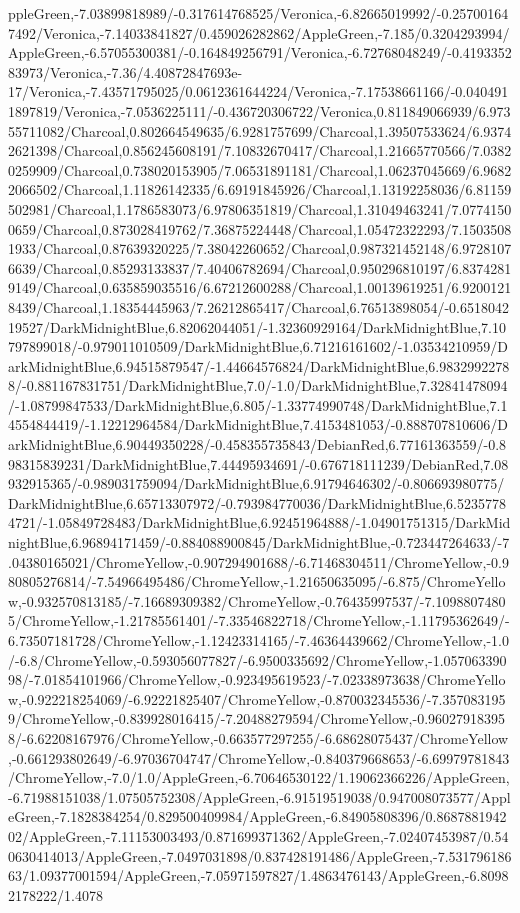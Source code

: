 {\begin{tikzternal}
ppleGreen,-7.03899818989/-0.317614768525/Veronica,-6.82665019992/-0.257001647492/Veronica,-7.14033841827/0.459026282862/AppleGreen,-7.185/0.3204293994/AppleGreen,-6.57055300381/-0.164849256791/Veronica,-6.72768048249/-0.419335283973/Veronica,-7.36/4.40872847693e-17/Veronica,-7.43571795025/0.0612361644224/Veronica,-7.17538661166/-0.0404911897819/Veronica,-7.0536225111/-0.436720306722/Veronica,0.811849066939/6.97355711082/Charcoal,0.802664549635/6.9281757699/Charcoal,1.39507533624/6.93742621398/Charcoal,0.856245608191/7.10832670417/Charcoal,1.21665770566/7.03820259909/Charcoal,0.738020153905/7.06531891181/Charcoal,1.06237045669/6.96822066502/Charcoal,1.11826142335/6.69191845926/Charcoal,1.13192258036/6.81159502981/Charcoal,1.1786583073/6.97806351819/Charcoal,1.31049463241/7.07741500659/Charcoal,0.873028419762/7.36875224448/Charcoal,1.05472322293/7.15035081933/Charcoal,0.87639320225/7.38042260652/Charcoal,0.987321452148/6.97281076639/Charcoal,0.85293133837/7.40406782694/Charcoal,0.950296810197/6.83742819149/Charcoal,0.635859035516/6.67212600288/Charcoal,1.00139619251/6.92001218439/Charcoal,1.18354445963/7.26212865417/Charcoal,6.76513898054/-0.651804219527/DarkMidnightBlue,6.82062044051/-1.32360929164/DarkMidnightBlue,7.10797899018/-0.979011010509/DarkMidnightBlue,6.71216161602/-1.03534210959/DarkMidnightBlue,6.94515879547/-1.44664576824/DarkMidnightBlue,6.98329922788/-0.881167831751/DarkMidnightBlue,7.0/-1.0/DarkMidnightBlue,7.32841478094/-1.08799847533/DarkMidnightBlue,6.805/-1.33774990748/DarkMidnightBlue,7.14554844419/-1.12212964584/DarkMidnightBlue,7.4153481053/-0.888707810606/DarkMidnightBlue,6.90449350228/-0.458355735843/DebianRed,6.77161363559/-0.898315839231/DarkMidnightBlue,7.44495934691/-0.676718111239/DebianRed,7.08932915365/-0.989031759094/DarkMidnightBlue,6.91794646302/-0.806693980775/DarkMidnightBlue,6.65713307972/-0.793984770036/DarkMidnightBlue,6.52357784721/-1.05849728483/DarkMidnightBlue,6.92451964888/-1.04901751315/DarkMidnightBlue,6.96894171459/-0.884088900845/DarkMidnightBlue,-0.723447264633/-7.04380165021/ChromeYellow,-0.907294901688/-6.71468304511/ChromeYellow,-0.980805276814/-7.54966495486/ChromeYellow,-1.21650635095/-6.875/ChromeYellow,-0.932570813185/-7.16689309382/ChromeYellow,-0.76435997537/-7.10988074805/ChromeYellow,-1.21785561401/-7.33546822718/ChromeYellow,-1.11795362649/-6.73507181728/ChromeYellow,-1.12423314165/-7.46364439662/ChromeYellow,-1.0/-6.8/ChromeYellow,-0.593056077827/-6.9500335692/ChromeYellow,-1.05706339098/-7.01854101966/ChromeYellow,-0.923495619523/-7.02338973638/ChromeYellow,-0.922218254069/-6.92221825407/ChromeYellow,-0.870032345536/-7.3570831959/ChromeYellow,-0.839928016415/-7.20488279594/ChromeYellow,-0.960279183958/-6.62208167976/ChromeYellow,-0.663577297255/-6.68628075437/ChromeYellow,-0.661293802649/-6.97036704747/ChromeYellow,-0.840379668653/-6.69979781843/ChromeYellow,-7.0/1.0/AppleGreen,-6.70646530122/1.19062366226/AppleGreen,-6.71988151038/1.07505752308/AppleGreen,-6.91519519038/0.947008073577/AppleGreen,-7.1828384254/0.829500409984/AppleGreen,-6.84905808396/0.868788194202/AppleGreen,-7.11153003493/0.871699371362/AppleGreen,-7.02407453987/0.540630414013/AppleGreen,-7.0497031898/0.837428191486/AppleGreen,-7.53179618663/1.09377001594/AppleGreen,-7.05971597827/1.4863476143/AppleGreen,-6.80982178222/1.4078
\end{tikzternal}}
